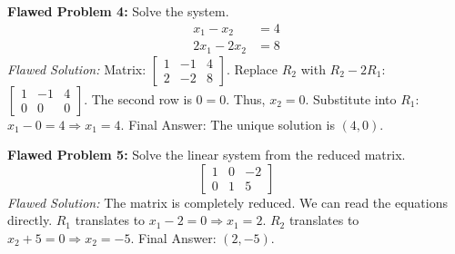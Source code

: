 \documentclass[11pt]{article}
\begin{document}
\vspace{0.3cm}
\textbf{Flawed Problem 4:} Solve the system.
\begin{align*}
    x_1 - x_2 &= 4 \\
    2x_1 - 2x_2 &= 8
\end{align*}
\textit{Flawed Solution:}
Matrix: $\begin{bmatrix} 1 & -1 & 4 \\ 2 & -2 & 8 \end{bmatrix}$.
Replace $R_2$ with $R_2 - 2R_1$: $\begin{bmatrix} 1 & -1 & 4 \\ 0 & 0 & 0 \end{bmatrix}$.
The second row is $0 = 0$. Thus, $x_2 = 0$.
Substitute into $R_1$: $x_1 - 0 = 4 \Rightarrow x_1 = 4$.
Final Answer: The unique solution is $(4, 0)$.

\vspace{0.3cm}
\textbf{Flawed Problem 5:} Solve the linear system from the reduced matrix.
\[
\begin{bmatrix}
1 & 0 & -2 \\
0 & 1 & 5
\end{bmatrix}
\]
\textit{Flawed Solution:}
The matrix is completely reduced. We can read the equations directly.
$R_1$ translates to $x_1 - 2 = 0 \Rightarrow x_1 = 2$.
$R_2$ translates to $x_2 + 5 = 0 \Rightarrow x_2 = -5$.
Final Answer: $(2, -5)$.
\end{document}
